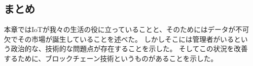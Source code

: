 \subsection{まとめ}
本章ではIoTが我々の生活の役に立っていることと、そのためにはデータが不可欠でその市場が誕生していることを述べた。
しかしそこには管理者がいるという政治的な、技術的な問題点が存在することを示した。
そしてこの状況を改善するために、ブロックチェーン技術というものがあることを示した。